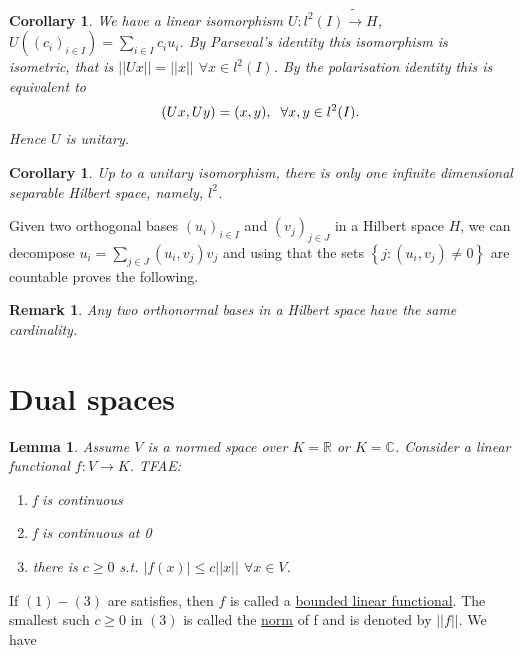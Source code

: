 \documentclass{article}
\newtheorem{lemma}[theorem]{Lemma}
\newtheorem{corollary}[theorem]{Corollary}
\newtheorem*{remark}{Remark}
\theoremstyle{definition}
\newcommand{\R}{\mathbb{R}}
\newcommand{\C}{\mathbb{C}}
\newcommand{\tmm}{\hspace{2mm}}
\begin{document}
\begin{corollary}
    We have a linear isomorphism $U:l^2(I)\tilde\rightarrow H$, $U\left((c_i)_{i\in I}\right)=\sum_{i\in I} c_i u_i$.
    By Parseval's identity this isomorphism is isometric, that is $||Ux|| = ||x||$ $\forall x\in l^2(I)$. By the polarisation
    identity this is equivalent to $$(Ux,Uy)=(x,y),\tmm\forall x,y\in l^2(I).$$
    Hence $U$ is unitary.
\end{corollary}

\begin{corollary}
    Up to a unitary isomorphism, there is only one infinite dimensional separable Hilbert space, namely, $l^2$.
\end{corollary}

Given two orthogonal bases $(u_i)_{i\in I}$ and $(v_j)_{j\in J}$ in a Hilbert space $H$, we can decompose $u_i=\sum_{j\in J}(u_i,v_j)v_j$ and using that the sets $\left\{ j:(u_i,v_j)\neq 0 \right\}$ are countable proves the following.
\begin{remark}
    Any two orthonormal bases in a Hilbert space have the same cardinality. 
\end{remark}

\section{Dual spaces}
\begin{lemma}
    Assume $V$ is a normed space over $K=\R$ or $K=\C$. Consider a linear functional $f:V\rightarrow K$. TFAE:
    \begin{enumerate}
        \item f is continuous
        \item f is continuous at 0
        \item there is $c\geq 0$ s.t. $|f(x)|\leq c||x||$ $\forall x\in V$.
    \end{enumerate}
\end{lemma}

If $(1)-(3)$ are satisfies, then $f$ is called a \underline{bounded linear functional}. The smallest such $c\geq 0$ in $(3)$ is called the \underline{norm} of f
and is denoted by $||f||$. We have 
\end{document}
